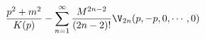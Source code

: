 \begin{equation}
\frac{p^2+m^2}{K(p)} - \sum_{n=1}^\infty \frac{M^{2n-2}}{(2n-2)!}
\V_{2n} (p,-p,0,\cdots,0)
\end{equation}

